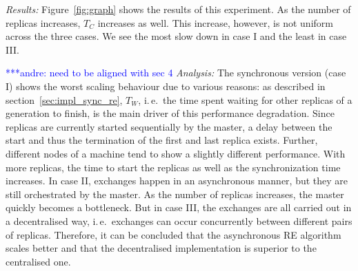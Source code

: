 \documentclass{rspublic}
\newcommand{\alnote}[1]{ {\textcolor{blue} { ***andre: #1 }}}
\newcommand{\alnote}[1]{}
\begin{document}


{\it Results:} Figure~\ref{fig:graph} shows the results of this 
experiment. As the number of replicas increases, $T_{C}$ increases 
as well. This increase, however, is not uniform across the three cases. 
We see the most slow down in case I and the least in case III.

\alnote{need to be aligned with sec 4}
{\it Analysis: } The synchronous version (case I) shows the
worst scaling behaviour due to various reasons: as described in section~\ref{sec:impl_sync_re},
$T_{W}$, i.\,e.\ the time spent waiting for other replicas of a generation to finish,
is the main driver of this performance degradation. Since replicas are currently started
sequentially by the master, a delay between the start and thus the termination of the first and 
last replica exists. Further, different nodes of a machine tend to show a slightly 
different performance. With more replicas, the time to start the replicas as well as the
synchronization time increases.  In case II, exchanges happen in
an asynchronous manner, but they are still orchestrated by the master. 
As the number of replicas increases, the master quickly becomes
a bottleneck. But in case III, the exchanges are all carried out in a
decentralised way, i.\,e.\ exchanges can occur concurrently between 
different pairs of replicas. Therefore, it can be concluded that the asynchronous
RE algorithm scales better and that the decentralised implementation
is superior to the centralised one.
\end{document}
